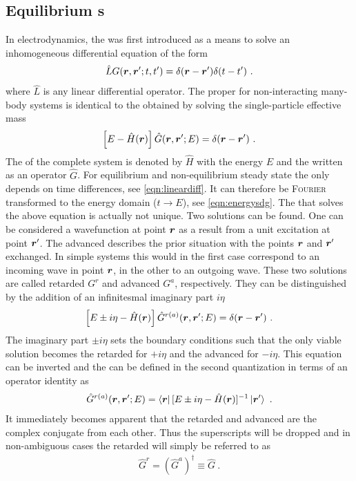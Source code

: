 \subsection{Equilibrium \cgfnc s}
In electrodynamics, the \gfnc{} was first introduced as a means to solve an inhomogeneous differential equation of the form
\begin{align}
\hat{L}G(\boldsymbol{r},\boldsymbol{r}';t,t') = \delta(\boldsymbol{r}-\boldsymbol{r}')\delta(t-t')\ .
\label{eqn:lineardiff}
\end{align}
where $\hat{L}$ is any linear differential operator. The proper \gfnc{} for non-interacting many-body systems is identical to the \gfnc{} obtained by solving the single-particle effective mass \sdg{} \cite{ferry1999transport}
\begin{align}
\left[ E -\hat{H}(\boldsymbol{r})\right] \hat{G}(\boldsymbol{r},\boldsymbol{r}';E) = \delta (\boldsymbol{r}-\boldsymbol{r}')\ .
\label{eqn:energysdg}
\end{align}
The \hamil{} of the complete system is denoted by $\hat{H}$ with the energy $E$ and the \gfnc{} written as an operator $\hat{G}$.
For equilibrium \cite{fetter2003quantum} and non-equilibrium steady state \cite{haug2008quantum} the \gfnc{} only depends on time differences, see \cref{eqn:lineardiff}. It can therefore be \textsc{Fourier} transformed to the energy domain ($t \rightarrow E$), see \cref{eqn:energysdg}. The \gfnc{} that solves the above equation is actually not unique. Two solutions can be found. One can be considered a wavefunction at point $\boldsymbol{r}$ as a result from a unit excitation at point $\boldsymbol{r}'$. The advanced \gfnc{} describes the prior situation with the points $\boldsymbol{r}$ and $\boldsymbol{r}'$ exchanged. In simple systems this would in the first case correspond to an incoming wave in point $\boldsymbol{r}$, in the other to an outgoing wave.
These two solutions are called retarded \gfnc{} $G^r$ and advanced \gfnc{} $G^a$, respectively. They can be distinguished by the addition of an infinitesmal imaginary part $i\eta$
\begin{align}
\left[ E \pm i \eta -\hat{H}(\boldsymbol{r})\right] \hat{G}^{r(a)}(\boldsymbol{r},\boldsymbol{r}';E) = \delta (\boldsymbol{r}-\boldsymbol{r}')\ .
\label{eqn:retardedandadvancedgfnc}
\end{align}
The imaginary part $\pm i\eta$ sets the boundary conditions such that the only viable solution becomes the retarded \gfnc{} for $+i\eta$ and the advanced \gfnc{} for $-i \eta$.
This equation can be inverted and the \gfnc{} can be defined in the second quantization in terms of an operator identity as
\begin{align}
\hat{G}^{r(a)}(\boldsymbol{r},\boldsymbol{r}';E) = \left< \boldsymbol{r} \right| [E\pm i \eta - \hat{H}(\boldsymbol{r})]^{-1} \left| \boldsymbol{r}' \right>\ .
\end{align}
It immediately becomes apparent that the retarded and advanced \gfnc{} are the complex conjugate from each other. Thus the superscripts will be dropped and in non-ambiguous cases the retarded \gfnc{} will simply be referred to as \gfnc{}
\begin{align}
\hat{G}^r = (\hat{G}^a)^{\dagger} \equiv \hat{G}\ .
\end{align}
